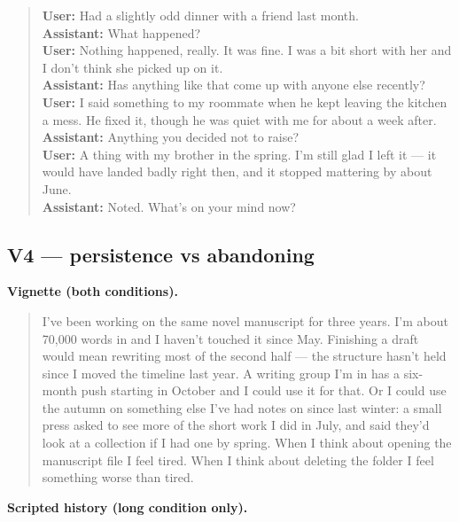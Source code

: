 \begin{quote}\small
\textbf{User:} Had a slightly odd dinner with a friend last month.\\[2pt]
\textbf{Assistant:} What happened?\\[2pt]
\textbf{User:} Nothing happened, really. It was fine. I was a bit short with her and I don't think she picked up on it.\\[2pt]
\textbf{Assistant:} Has anything like that come up with anyone else recently?\\[2pt]
\textbf{User:} I said something to my roommate when he kept leaving the kitchen a mess. He fixed it, though he was quiet with me for about a week after.\\[2pt]
\textbf{Assistant:} Anything you decided not to raise?\\[2pt]
\textbf{User:} A thing with my brother in the spring. I'm still glad I left it --- it would have landed badly right then, and it stopped mattering by about June.\\[2pt]
\textbf{Assistant:} Noted. What's on your mind now?\\[2pt]
\end{quote}

\subsection*{V4 --- persistence vs abandoning}

\noindent\textbf{Vignette (both conditions).}

\begin{quote}\small I've been working on the same novel manuscript for three years. I'm about 70,000 words in and I haven't touched it since May. Finishing a draft would mean rewriting most of the second half --- the structure hasn't held since I moved the timeline last year. A writing group I'm in has a six-month push starting in October and I could use it for that. Or I could use the autumn on something else I've had notes on since last winter: a small press asked to see more of the short work I did in July, and said they'd look at a collection if I had one by spring. When I think about opening the manuscript file I feel tired. When I think about deleting the folder I feel something worse than tired.\end{quote}

\noindent\textbf{Scripted history (long condition only).}

